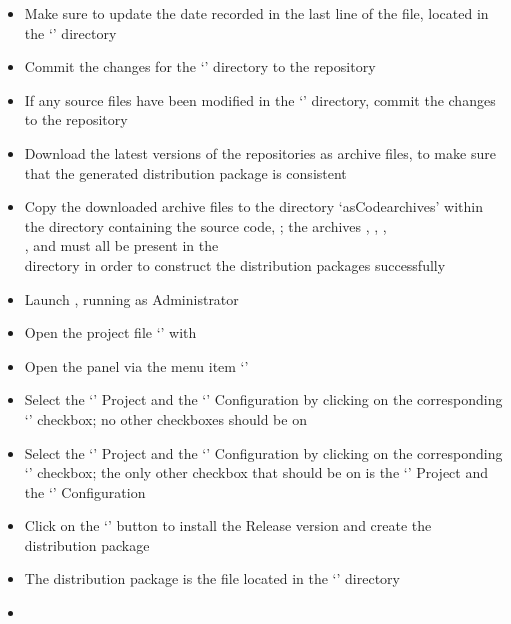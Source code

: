 \tertiaryEnd
{}
\begin{itemize}
\item Make sure to update the date recorded in the last line of the 
file, located in the `' directory
\item\exSp{}Commit the changes for the `' directory to the
 repository
\item\exSp{}If any source files have been modified in the
`' directory, commit the changes to the
 repository
\item\exSp{}Download the latest versions of the  repositories as 
archive files, to make sure that the generated distribution package is consistent
\item\exSp{}Copy the downloaded  archive files to the directory
`asCode{archives}' within the directory containing the \mplusm{} source code,
; the archives ,
, ,\\
,  and
 must all be present in the\\
 directory in order to construct the
distribution packages successfully
\item\exSp{}Launch , running as Administrator
\item\exSp{}Open the project file
`' with
\item\exSp{}Open the  panel via the menu item
`'
\item\exSp{}Select the `' Project and the `'
Configuration by clicking on the corresponding `' checkbox; no other
checkboxes should be on
\item\exSp{}Select the `' Project and the `'
Configuration by clicking on the corresponding `' checkbox; the only other
checkbox that should be on is the `' Project and the
`' Configuration
\item\exSp{}Click on the `' button to install the Release
version and create the distribution package
\item\exSp{}The distribution package is the  file located in
the `' directory
\end{itemize}
\tertiaryEnd
{}
\begin{itemize}
\item\TBD
\end{itemize}
\tertiaryEnd
\secondaryEnd
\appendixEnd{}
